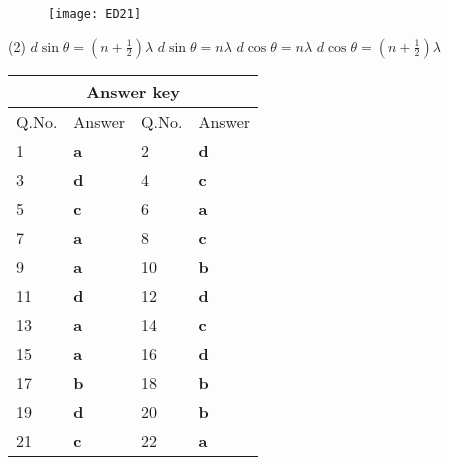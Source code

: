 \begin{enumerate}
{}
\begin{figure}[H]
	\centering
	\texttt{[image: ED21]}
\end{figure}
 \begin{tasks}(2)
	\task[\textbf{a.}]$d \sin \theta=\left(n+\frac{1}{2}\right) \lambda$
	\task[\textbf{b.}]$d \sin \theta=n \lambda$
	\task[\textbf{c.}] $d \cos \theta=n \lambda$
	\task[\textbf{d.}] $d \cos \theta=\left(n+\frac{1}{2}\right) \lambda$
\end{tasks}
\end{enumerate}
\setlength\arrayrulewidth{1pt}
\begin{table}[H]
	\centering
	\begin{tabular}{|p{1.5cm}|p{1.5cm}||p{1.5cm}|p{1.5cm}|}
		\hline
		\multicolumn{4}{|c|}{\textbf{Answer key}}\\\hline\hline
		\rowcolor{ocrel}Q.No.&Answer&Q.No.&Answer\\\hline
		1&\textbf{a} &2&\textbf{d}\\\hline 
		3&\textbf{d} &4&\textbf{c} \\\hline
		5&\textbf{c} &6&\textbf{a} \\\hline
		7&\textbf{a}&8&\textbf{c}\\\hline
		9&\textbf{a}&10&\textbf{b}\\\hline
		11&\textbf{d} &12&\textbf{d}\\\hline
		13&\textbf{a}&14&\textbf{c}\\\hline
		15&\textbf{a}&16&\textbf{d} \\\hline
		17&\textbf{b}&18&\textbf{b}\\\hline
		19&\textbf{d}&20&\textbf{b}\\\hline
		21&\textbf{c} &22&\textbf{a}\\\hline
	\end{tabular}
\end{table}


